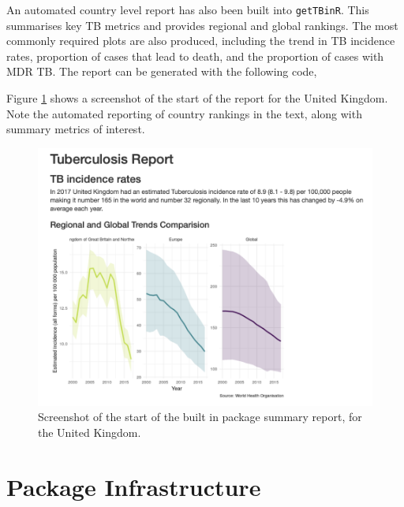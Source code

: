 \documentclass[11pt,twoside]{bristolthesis}
\begin{document}
  An automated country level report has also been built into \texttt{getTBinR}. This summarises key TB metrics and provides regional and global rankings. The most commonly required plots are also produced, including the trend in TB incidence rates, proportion of cases that lead to death, and the proportion of cases with MDR TB. The report can be generated with the following code,
  \begin{Shaded}
  \begin{Highlighting}[]
  \NormalTok{(} \NormalTok{, } \NormalTok{)}
  \end{Highlighting}
  \end{Shaded}
  Figure \ref{fig:report-snapshot} shows a screenshot of the start of the report for the United Kingdom. Note the automated reporting of country rankings in the text, along with summary metrics of interest.
  \begin{figure}
  
  {\centering \includegraphics[width=0.8\linewidth]{chapters/getTBinR/img/ExampleCountryReport} 
  
  }
  
  \caption{Screenshot of the start of the built in package summary report, for the United Kingdom.}\label{fig:report-snapshot}
  \end{figure}
  \hypertarget{package-infrastructure}{%
  \section{Package Infrastructure}\label{package-infrastructure}}
  
\end{document}
